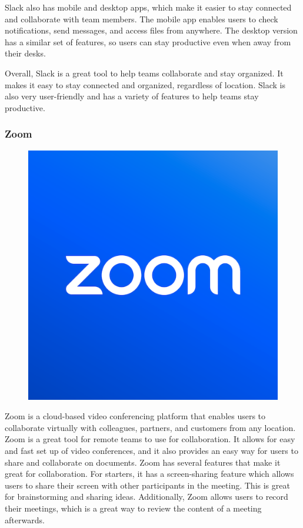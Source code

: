 \documentclass[12pt,a4paper]{report}
\begin{document}
Slack also has mobile and desktop apps, which make it easier to stay connected and collaborate with team members. The mobile app enables users to check notifications, send messages, and access files from anywhere. The desktop version has a similar set of features, so users can stay productive even when away from their desks.

Overall, Slack is a great tool to help teams collaborate and stay organized. It makes it easy to stay connected and organized, regardless of location. Slack is also very user-friendly and has a variety of features to help teams stay productive.
\subsubsection*{Zoom}

\begin{figure}
\includegraphics[width=1\linewidth]{zoom.png}
\end{figure}

Zoom is a cloud-based video conferencing platform that enables users to collaborate virtually with colleagues, partners, and customers from any location. Zoom is a great tool for remote teams to use for collaboration. It allows for easy and fast set up of video conferences, and it also provides an easy way for users to share and collaborate on documents. Zoom has several features that make it great for collaboration. For starters, it has a screen-sharing feature which allows users to share their screen with other participants in the meeting. This is great for brainstorming and sharing ideas. Additionally, Zoom allows users to record their meetings, which is a great way to review the content of a meeting afterwards.
\end{document}

